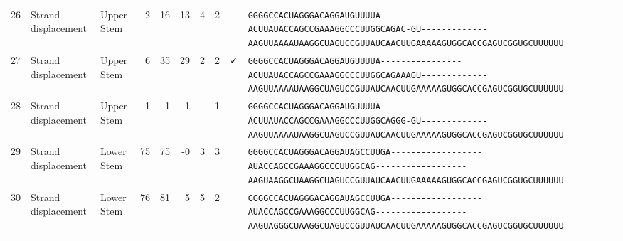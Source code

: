 \begin{tabular}{rllrrrrrcl}
 26 & Strand displacement & Upper Stem & 2 & 16 & 13 & 4 & 2 &  &
 \color{ucsfdarkgrey}\verb|GGGGCCACUAGGGACAGGAU|\color{ucsforange}\verb|GUUUUA|\color{ucsfblue}\verb|----------------ACUU|\color{ucsfpurple}\verb|AUACCAGCCGAAAGGCCCUUGGCAG|\color{ucsfblue}\verb|AC-GU-------------AAGU|\color{ucsforange}\verb|UAAAAUAA|\color{ucsfnavy}\verb|GGCUAGUCC|\color{ucsforange}\verb|GUUAUCA|\color{ucsfteal}\verb|ACUUGAAAAAGU|\color{ucsforange}\verb|GGCACCGAGUCGGUGCUUUUUU| \\

 27 & Strand displacement & Upper Stem & 6 & 35 & 29 & 2 & 2 & ✓ &
 \color{ucsfdarkgrey}\verb|GGGGCCACUAGGGACAGGAU|\color{ucsforange}\verb|GUUUUA|\color{ucsfblue}\verb|----------------ACUU|\color{ucsfpurple}\verb|AUACCAGCCGAAAGGCCCUUGGCAG|\color{ucsfblue}\verb|AAAGU-------------AAGU|\color{ucsforange}\verb|UAAAAUAA|\color{ucsfnavy}\verb|GGCUAGUCC|\color{ucsforange}\verb|GUUAUCA|\color{ucsfteal}\verb|ACUUGAAAAAGU|\color{ucsforange}\verb|GGCACCGAGUCGGUGCUUUUUU| \\

 28 & Strand displacement & Upper Stem & 1 & 1 & 1 &  & 1 &  &
 \color{ucsfdarkgrey}\verb|GGGGCCACUAGGGACAGGAU|\color{ucsforange}\verb|GUUUUA|\color{ucsfblue}\verb|----------------ACUU|\color{ucsfpurple}\verb|AUACCAGCCGAAAGGCCCUUGGCAG|\color{ucsfblue}\verb|GG-GU-------------AAGU|\color{ucsforange}\verb|UAAAAUAA|\color{ucsfnavy}\verb|GGCUAGUCC|\color{ucsforange}\verb|GUUAUCA|\color{ucsfteal}\verb|ACUUGAAAAAGU|\color{ucsforange}\verb|GGCACCGAGUCGGUGCUUUUUU| \\

 29 & Strand displacement & Lower Stem & 75 & 75 & -0 & 3 & 3 &  &
 \color{ucsfdarkgrey}\verb|GGGGCCACUAGGGACAGGAU|\color{ucsforange}\verb|AGCCUU|\color{ucsfblue}\verb|GA------------------|\color{ucsfpurple}\verb|AUACCAGCCGAAAGGCCCUUGGCAG|\color{ucsfblue}\verb|------------------AAGU|\color{ucsforange}\verb|AAGGCUAA|\color{ucsfnavy}\verb|GGCUAGUCC|\color{ucsforange}\verb|GUUAUCA|\color{ucsfteal}\verb|ACUUGAAAAAGU|\color{ucsforange}\verb|GGCACCGAGUCGGUGCUUUUUU| \\

 30 & Strand displacement & Lower Stem & 76 & 81 & 5 & 5 & 2 &  &
 \color{ucsfdarkgrey}\verb|GGGGCCACUAGGGACAGGAU|\color{ucsforange}\verb|AGCCUU|\color{ucsfblue}\verb|GA------------------|\color{ucsfpurple}\verb|AUACCAGCCGAAAGGCCCUUGGCAG|\color{ucsfblue}\verb|------------------AAGU|\color{ucsforange}\verb|AGGGCUAA|\color{ucsfnavy}\verb|GGCUAGUCC|\color{ucsforange}\verb|GUUAUCA|\color{ucsfteal}\verb|ACUUGAAAAAGU|\color{ucsforange}\verb|GGCACCGAGUCGGUGCUUUUUU| \\


\end{tabular}
